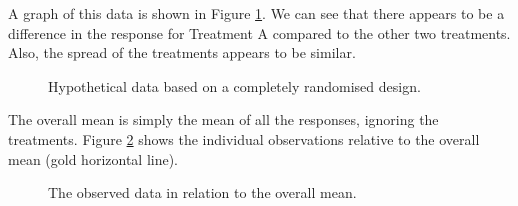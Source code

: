 \documentclass[a4paper, 10pt, fleqn, twosided]{memoir}
\begin{document}
\clearpage

A graph of this data is shown in Figure \ref{fig:hypcrdbox}. We can see that there appears to be a difference in the
response for Treatment A compared to the other two treatments. Also, the spread of the treatments appears to be
similar.

\begin{figure}[!hbtp]
\centering
{}
\caption{Hypothetical data based on a completely randomised design.}
\label{fig:hypcrdbox}
\end{figure}

The overall mean is simply the mean of all the responses, ignoring the treatments. Figure \ref{fig:hypcrdoverallmean}
shows the individual observations relative to the overall mean (gold horizontal line).


\begin{figure}[!hbtp]
\centering
{}
\caption{The observed data in relation to the overall mean.}
\label{fig:hypcrdoverallmean}
\end{figure}
\end{document}
